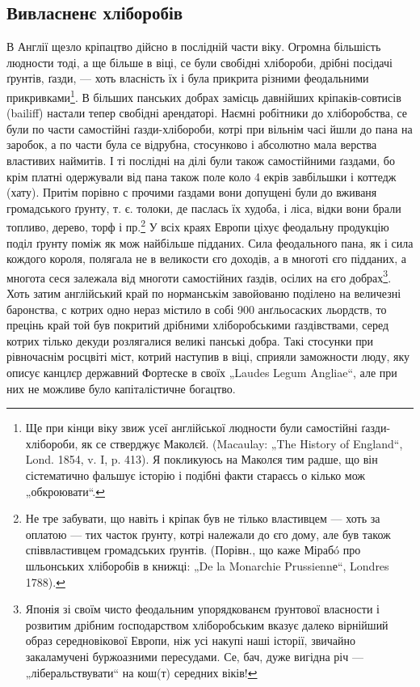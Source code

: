 
\subsection{Вивласненє хліборобів}

В Англії щезло кріпацтво дійсно в послідній части  віку. Огромна більшість людности тоді, а ще
більше в  віці, се були свобідні хлібороби, дрібні посідачі ґрунтів, ґазди, — хоть власність їх і
була прикрита різними феодальними прикривками\footnote{
Ще при кінци  віку звиж  усеї англійської людности були самостійні ґазди-хлібороби, як се
стверджує Маколєй. (Macaulay: „The History of England“, Lond. 1854, v. I, p. 413). Я покликуюсь на
Маколєя тим радше, що він сістематично фальшує історію і подібні факти стараєсь о кілько мож
„обкроювати“.
}. В більших панських добрах замісць давнійших
кріпаків-совтисів (bailiff) настали тепер свобідні арендаторі. Наємні робітники до хліборобства, се
були по части самостійні ґазди-хлібороби, котрі при вільнім часі йшли до пана на заробок, а по части
була се відрубна, стосунково і абсолютно мала верства властивих наймитів. І ті послідні на ділі були
також самостійними ґаздами, бо крім платні одержували від пана також поле коло 4 екрів завбільшки і
коттедж (хату). Притім порівно с прочими ґаздами вони допущені були до вживаня громадського ґрунту,
т. є. толоки, де паслась їх худоба, і ліса, відки вони брали топливо, дерево, торф і пр.\footnote{
Не тре забувати, що навіть і кріпак був не тілько властивцем — хоть за оплатою — тих часток
ґрунту, котрі належали до єго дому, але був також співвластивцем громадських ґрунтів. (Порівн., що
каже Мірабó про шльонських хліборобів в книжці: „De la Monarchie Prussiennе“, Londres 1788).
} У всіх краях Европи ціхує феодальну продукцію поділ ґрунту поміж як мож найбільше підданих. Сила
феодального пана, як і сила кождого короля, полягала не в великости єго доходів, а в многоті єго
підданих, а многота сеся залежала від многоти самостійних ґаздів, осілих на єго добрах\footnote{
Японія зі своїм чисто феодальним упорядкованєм ґрунтової власности і розвитим дрібним
ґосподарством хліборобським вказує далеко вірнійший образ середновікової Европи, ніж усі накупі наші
історії, звичайно закаламучені буржоазними пересудами. Се, бач, дуже вигідна річ —
„ліберальствувати“ на кош(т) середних віків!}. Хоть
затим англійський край по норманськім завойованю поділено на величезні баронства, с котрих одно
нераз містило в собі 900 анґльосаских льордств, то прецінь край той був покритий дрібними
хліборобськими ґаздівствами, серед котрих тілько декуди розлягалися великі панські добра. Такі
стосунки при рівночаснім росцвіті міст, котрий наступив в  віці, сприяли заможности люду, яку
описує канцлєр державний Фортеске в своїх „Laudes Legum Angliae“, але при них не можливе було
капіталістичне богацтво.
